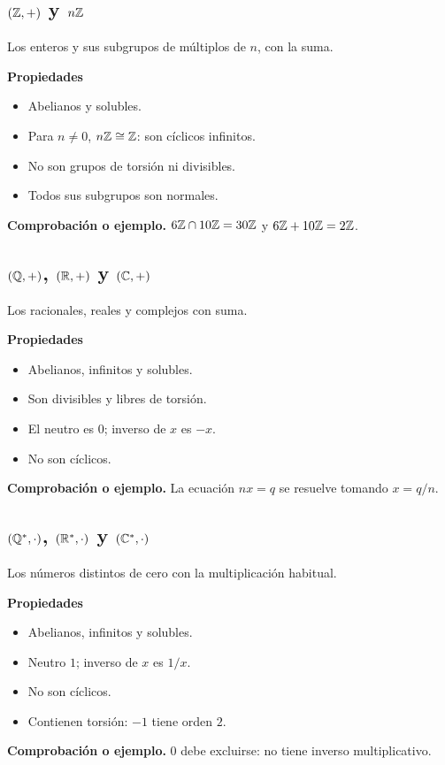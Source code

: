 \documentclass[11pt,a4paper]{article}
\begin{document}
\subsection{$(\mathbb{Z},+)$ y $n\mathbb{Z}$}
\begin{ejemplo}
Los enteros y sus subgrupos de múltiplos de $n$, con la suma.
\end{ejemplo}
\textbf{Propiedades}
\begin{itemize}
\item Abelianos y solubles.
\item Para $n\ne0$, $n\mathbb{Z}\cong\mathbb{Z}$: son cíclicos infinitos.
\item No son grupos de torsión ni divisibles.
\item Todos sus subgrupos son normales.
\end{itemize}
\textbf{Comprobación o ejemplo.} $6\mathbb{Z}\cap10\mathbb{Z}=30\mathbb{Z}$ y $6\mathbb{Z}+10\mathbb{Z}=2\mathbb{Z}$.

\subsection{$(\mathbb{Q},+)$, $(\mathbb{R},+)$ y $(\mathbb{C},+)$}
\begin{ejemplo}
Los racionales, reales y complejos con suma.
\end{ejemplo}
\textbf{Propiedades}
\begin{itemize}
\item Abelianos, infinitos y solubles.
\item Son divisibles y libres de torsión.
\item El neutro es $0$; inverso de $x$ es $-x$.
\item No son cíclicos.
\end{itemize}
\textbf{Comprobación o ejemplo.} La ecuación $nx=q$ se resuelve tomando $x=q/n$.

\subsection{$(\mathbb{Q}^*,\cdot)$, $(\mathbb{R}^*,\cdot)$ y $(\mathbb{C}^*,\cdot)$}
\begin{ejemplo}
Los números distintos de cero con la multiplicación habitual.
\end{ejemplo}
\textbf{Propiedades}
\begin{itemize}
\item Abelianos, infinitos y solubles.
\item Neutro $1$; inverso de $x$ es $1/x$.
\item No son cíclicos.
\item Contienen torsión: $-1$ tiene orden $2$.
\end{itemize}
\textbf{Comprobación o ejemplo.} $0$ debe excluirse: no tiene inverso multiplicativo.
\end{document}
